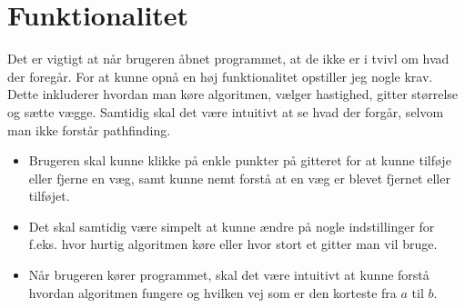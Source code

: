 \documentclass[12pt]{article}
\begin{document}
\section{Funktionalitet}
Det er vigtigt at når brugeren åbnet programmet, at de ikke er i tvivl om hvad der foregår. For at kunne opnå en høj funktionalitet opstiller jeg nogle krav. Dette inkluderer hvordan man køre algoritmen, vælger hastighed, gitter størrelse og sætte vægge. Samtidig skal det være intuitivt at se hvad der forgår, selvom man ikke forstår pathfinding. 
\begin{itemize}
  \item Brugeren skal kunne klikke på enkle punkter på gitteret for at kunne tilføje eller fjerne en væg, samt kunne nemt forstå at en væg er blevet fjernet eller tilføjet. 
  \item Det skal samtidig være simpelt at kunne ændre på nogle indstillinger for f.eks. hvor hurtig algoritmen køre eller hvor stort et gitter man vil bruge. 
  \item Når brugeren kører programmet, skal det være intuitivt at kunne forstå hvordan algoritmen fungere og hvilken vej som er den korteste fra $a$ til $b$.
\end{itemize}
\newpage
\end{document}
